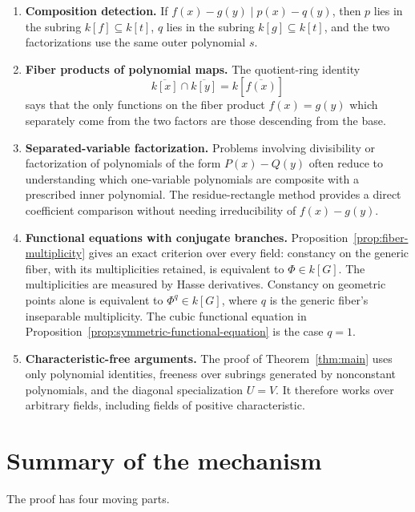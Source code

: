 \documentclass[11pt]{article}
\theoremstyle{plain}
\theoremstyle{definition}
\theoremstyle{remark}
\newcommand{\U}{U}
\newcommand{\V}{V}
\newcommand{\ol}[1]{\overline{#1}}
\begin{document}
\begin{enumerate}
    \item \textbf{Composition detection.}
    If \(f(x)-g(y)\mid p(x)-q(y)\), then \(p\) lies in the subring \(k[f]\subseteq k[t]\), \(q\) lies in the subring \(k[g]\subseteq k[t]\), and the two factorizations use the same outer polynomial \(s\).

    \item \textbf{Fiber products of polynomial maps.}
    The quotient-ring identity
    \[
        \ol{k[x]}\cap \ol{k[y]}
        =
        k[\ol{f(x)}]
    \]
    says that the only functions on the fiber product \(f(x)=g(y)\) which separately come from the two factors are those descending from the base.

    \item \textbf{Separated-variable factorization.}
    Problems involving divisibility or factorization of polynomials of the form \(P(x)-Q(y)\) often reduce to understanding which one-variable polynomials are composite with a prescribed inner polynomial. The residue-rectangle method provides a direct coefficient comparison without needing irreducibility of \(f(x)-g(y)\).

    \item \textbf{Functional equations with conjugate branches.}
    Proposition~\ref{prop:fiber-multiplicity} gives an exact criterion over every field: constancy on the generic fiber, with its multiplicities retained, is equivalent to \(\Phi\in k[G]\). The multiplicities are measured by Hasse derivatives. Constancy on geometric points alone is equivalent to \(\Phi^q\in k[G]\), where \(q\) is the generic fiber's inseparable multiplicity. The cubic functional equation in Proposition~\ref{prop:symmetric-functional-equation} is the case \(q=1\).

    \item \textbf{Characteristic-free arguments.}
    The proof of Theorem~\ref{thm:main} uses only polynomial identities, freeness over subrings generated by nonconstant polynomials, and the diagonal specialization \(\U=\V\). It therefore works over arbitrary fields, including fields of positive characteristic.
\end{enumerate}

\section{Summary of the mechanism}

The proof has four moving parts.
\end{document}
